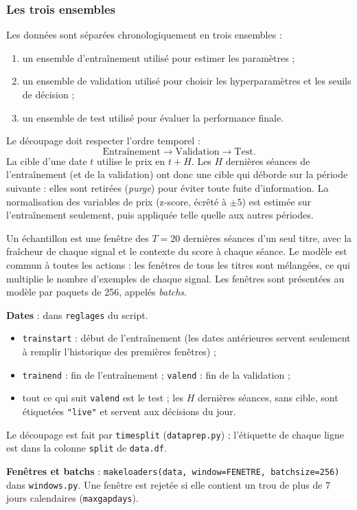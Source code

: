 \documentclass[11pt,a4paper]{article}
\renewcommand{\_}{\usorig\allowbreak}   %
\newcommand{\f}[1]{\texttt{#1}}        %
\begin{document}
\subsubsection{Les trois ensembles}
Les données sont séparées chronologiquement en trois ensembles :
\begin{enumerate}[nosep]
  \item un ensemble d'entraînement utilisé pour estimer les paramètres ;
  \item un ensemble de validation utilisé pour choisir les hyperparamètres et les seuils de décision ;
  \item un ensemble de test utilisé pour évaluer la performance finale.
\end{enumerate}
Le découpage doit respecter l'ordre temporel :
\[
  \text{Entraînement} \longrightarrow \text{Validation} \longrightarrow \text{Test}.
\]
La cible d'une date $t$ utilise le prix en $t+H$. Les $H$ dernières séances de
l'entraînement (et de la validation) ont donc une cible qui déborde sur la période
suivante : elles sont retirées (\emph{purge}) pour éviter toute fuite d'information.
La normalisation des variables de prix (z-score, écrêté à $\pm 5$) est estimée sur
l'entraînement seulement, puis appliquée telle quelle aux autres périodes.

Un échantillon est une fenêtre des $T=20$ dernières séances d'un seul titre, avec la
fraîcheur de chaque signal et le contexte du score à chaque séance. Le modèle est commun
à toutes les actions : les fenêtres de tous les titres sont mélangées, ce qui multiplie
le nombre d'exemples de chaque signal. Les fenêtres sont présentées au modèle par paquets
de 256, appelés \emph{batchs}.

\begin{danslecode}
\textbf{Dates} : dans \f{reglages} du script.
\begin{itemize}[nosep]
  \item \f{train\_start} : début de l'entraînement (les dates antérieures servent seulement
  à remplir l'historique des premières fenêtres) ;
  \item \f{train\_end} : fin de l'entraînement ; \f{val\_end} : fin de la validation ;
  \item tout ce qui suit \f{val\_end} est le test ; les $H$ dernières séances, sans cible,
  sont étiquetées \f{"live"} et servent aux décisions du jour.
\end{itemize}
Le découpage est fait par \f{time\_split} (\f{data\_prep.py}) ; l'étiquette de chaque ligne
est dans la colonne \f{split} de \f{data.df}.

\textbf{Fenêtres et batchs} : \f{make\_loaders(data, window=FENETRE, batch\_size=256)}
dans \f{windows.py}. Une fenêtre est rejetée si elle contient un trou de plus de 7 jours
calendaires (\f{max\_gap\_days}).
\end{danslecode}
\end{document}
